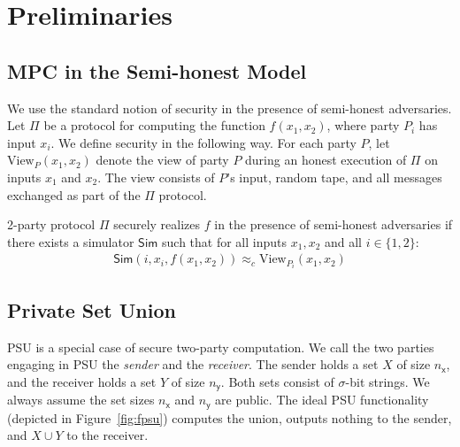 \section{Preliminaries}\label{sec:preliminaries}

\subsection{MPC in the Semi-honest Model}
We use the standard notion of security in the presence of semi-honest adversaries. 
Let $\Pi$ be a protocol for computing the function $f(x_1, x_2)$, where party $P_i$ has input $x_i$. 
We define security in the following way.
For each party $P$, let $\text{View}_P(x_1, x_2)$ denote the view of party $P$ 
during an honest execution of $\Pi$ on inputs $x_1$ and $x_2$. 
The view consists of $P$'s input, random tape, and all messages exchanged as part of the $\Pi$ protocol. 

\begin{definition}
2-party protocol $\Pi$ securely realizes $f$ in the presence of semi-honest adversaries if 
there exists a simulator $\mathsf{Sim}$ such that for all inputs $x_1, x_2$ and all $i \in \{1,2\}$:
\begin{gather*}
\mathsf{Sim}(i, x_i, f(x_1, x_2)) \approx_c \text{View}_{P_i}(x_1, x_2)
\end{gather*}
\end{definition}


\subsection{Private Set Union}\label{subsec:psu}
PSU is a special case of secure two-party computation. 
We call the two parties engaging in PSU the \emph{sender} and the \emph{receiver}. 
The sender holds a set $X$ of size $n_\mathsf{x}$, and the receiver holds a set $Y$ of size $n_\mathsf{y}$. 
Both sets consist of $\sigma$-bit strings. 
We always assume the set sizes $n_\mathsf{x}$ and $n_\mathsf{y}$ are public.  
The ideal PSU functionality (depicted in Figure~\ref{fig:fpsu}) computes the union, 
outputs nothing to the sender, and $X \cup Y$ to the receiver.


